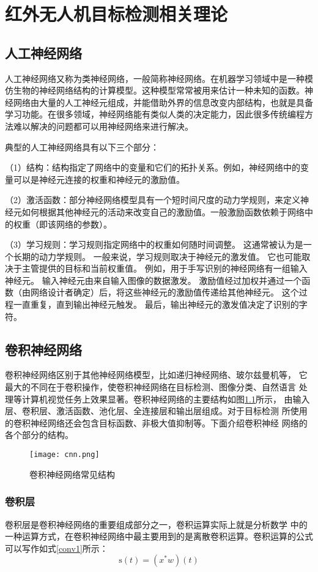 \chapter{红外无人机目标检测相关理论}

\section{人工神经网络}
人工神经网络又称为类神经网络，一般简称神经网络。在机器学习领域中是一种模仿生物的神经网络结构的计算模型。这种模型常常被用来估计一种未知的函数。神经网络由大量的人工神经元组成，并能借助外界的信息改变内部结构，也就是具备学习功能。在很多领域，神经网络能有类似人类的决定能力，因此很多传统编程方法难以解决的问题都可以用神经网络来进行解决。

典型的人工神经网络具有以下三个部分：

（1）结构：结构指定了网络中的变量和它们的拓扑关系。例如，神经网络中的变量可以是神经元连接的权重和神经元的激励值。

（2）激活函数：部分神经网络模型具有一个短时间尺度的动力学规则，来定义神经元如何根据其他神经元的活动来改变自己的激励值。一般激励函数依赖于网络中的权重（即该网络的参数）。

（3）学习规则：学习规则指定网络中的权重如何随时间调整。 这通常被认为是一个长期的动力学规则。 一般来说，学习规则取决于神经元的激发值。 它也可能取决于主管提供的目标和当前权重值。 例如，用于手写识别的神经网络有一组输入神经元。 输入神经元由来自输入图像的数据激发。 激励值经过加权并通过一个函数（由网络设计者确定）后，将这些神经元的激励值传递给其他神经元。 这个过程一直重复，直到输出神经元触发。 最后，输出神经元的激发值决定了识别的字符。

\section{卷积神经网络}
卷积神经网络区别于其他神经网络模型，比如递归神经网络、玻尔兹曼机等，
它最大的不同在于卷积操作，使卷积神经网络在目标检测、图像分类、自然语言
处理等计算机视觉任务上效果显著。卷积神经网络的主要结构如图\ref{cnn}所示，
由输入层、卷积层、激活函数、池化层、全连接层和输出层组成。对于目标检测
所使用的卷积神经网络还会包含目标函数、非极大值抑制等。下面介绍卷积神经
网络的各个部分的结构。

\begin{figure}[htbp]
    \centering
    \texttt{[image: cnn.png]}
    \caption{卷积神经网络常见结构}
    \label{cnn}
\end{figure}

\subsection{卷积层}
卷积层是卷积神经网络的重要组成部分之一，卷积运算实际上就是分析数学
中的一种运算方式，在卷积神经网络中最主要用到的是离散卷积运算。卷积运算的公式可以写作如式\ref{conv1}所示：
\begin{equation}
    \mathrm{s}(t)=\left(x^{*} w\right)(t)
    \label{conv1}
\end{equation}

